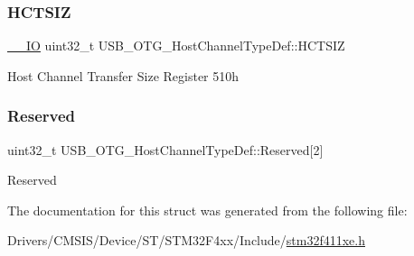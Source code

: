 \subsubsection{\texorpdfstring{H\+C\+T\+S\+IZ}{HCTSIZ}}
{\footnotesize\ttfamily \hyperlink{core__sc300_8h_aec43007d9998a0a0e01faede4133d6be}{\+\_\+\+\_\+\+IO} uint32\+\_\+t U\+S\+B\+\_\+\+O\+T\+G\+\_\+\+Host\+Channel\+Type\+Def\+::\+H\+C\+T\+S\+IZ}

Host Channel Transfer Size Register 510h \mbox{\label{struct_u_s_b___o_t_g___host_channel_type_def_aa85d014d19b79d61bed7fdf134ed1037}} 
\subsubsection{\texorpdfstring{Reserved}{Reserved}}
{\footnotesize\ttfamily uint32\+\_\+t U\+S\+B\+\_\+\+O\+T\+G\+\_\+\+Host\+Channel\+Type\+Def\+::\+Reserved\mbox{[}2\mbox{]}}

Reserved 

The documentation for this struct was generated from the following file\+:\begin{DoxyCompactItemize}
\item 
Drivers/\+C\+M\+S\+I\+S/\+Device/\+S\+T/\+S\+T\+M32\+F4xx/\+Include/\hyperlink{stm32f411xe_8h}{stm32f411xe.\+h}\end{DoxyCompactItemize}
